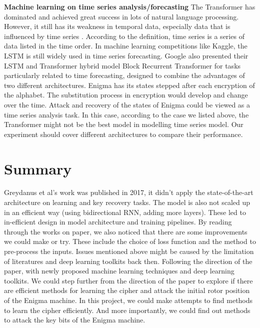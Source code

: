 \noindent\textbf{Machine learning on time series analysis/forecasting} \qquad		The Transformer has dominated and achieved great success in lots of natural language processing. However, it still has its weakness in temporal data, especially data that is influenced by time series \cite{lim2021time}. 
According to the definition, time series is a series of data listed in the time order. In machine learning competitions like Kaggle, the LSTM is still widely used in time series forecasting. Google also presented their LSTM and Transformer hybrid model Block Recurrent Transformer \cite{hutchins2022block} for tasks particularly related to time forecasting, designed to combine the advantages of two different architectures.
Enigma has its states stepped after each encryption of the alphabet. The substitution process in encryption would develop and change over the time. Attack and recovery of the states of Enigma could be viewed as a time series analysis task. In this case, according to the case we listed above, the Transformer might not be the best model in modelling time series model. Our experiment should cover different architectures to compare their performance.


\section{Summary}
Greydanus \cite{greydanus2017learning} et al's work was published in 2017, it didn’t apply the state-of-the-art architecture on learning and key recovery tasks. The model is also not scaled up in an efficient way (using bidirectional RNN, adding more layers). These led to in-efficient design in model architecture and training pipelines. By reading through the works on paper, we also noticed that there are some improvements we could make or try. These include the choice of loss function and the method to pre-process the inputs.
Issues mentioned above might be caused by the limitation of literatures and deep learning toolkits back then. Following the direction of the paper, with newly proposed machine learning techniques and deep learning toolkits. We could step further from the direction of the paper to explore if there are efficient methods for learning the cipher and attack the initial rotor position of the Enigma machine. In this project, we could make attempts to find methods to learn the cipher efficiently. And more importantly, we could find out methods to attack the key bits of the Enigma machine.

